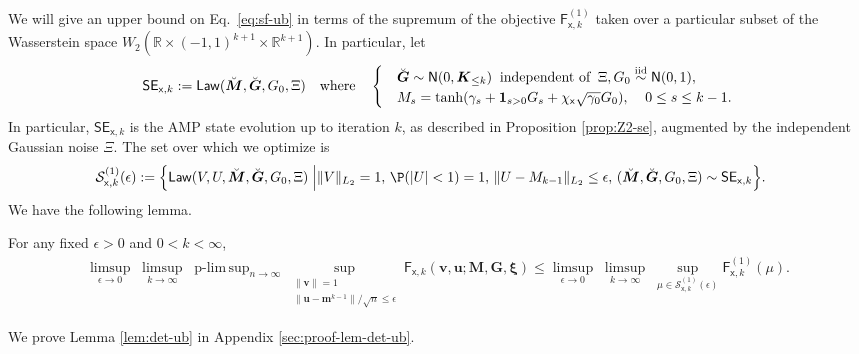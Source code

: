 \documentclass[]{article}
\def\sx{{\mathsf x}}
\def\normal{{\sf N}}
\def\bv{{\boldsymbol V}}
\def\bM{{\boldsymbol M}}
\def\bu{{\boldsymbol u}}
\def\bv{{\boldsymbol v}}
\def\bxi{{\boldsymbol \xi}}
\def\reals{{\mathbb R}}
\def\bG{{\boldsymbol G}}
\def\bv{{\boldsymbol v}}
\def\normal{{\sf N}}
\def\bu{{\boldsymbol u}}
\def\cS{{\mathcal S}}
\def\bbm{{\boldsymbol m}}
\def\cS{{\mathcal S}}
\def\bK{\boldsymbol{K}}
\newcommand{\indic}[1]{\mathbf{1}_{#1}}
\def\sF{\mathsf{F}}
\def\brevebM{\breve{\boldsymbol{M}}{}}
\def\brevebG{\breve{\boldsymbol{G}}{}}
\DeclareMathOperator*{\plimsup}{p-lim\,sup}
\def\Law{\mathsf{Law}}
\def\SE{\mathsf{SE}}
\begin{document}
We will give an upper bound on Eq.~\eqref{eq:sf-ub} 
in terms of the supremum of the objective $\sF^{(1)}_{\sx,k}$ taken over a particular subset of the Wasserstein space $W_2(\reals \times (-1,1)^{k+1} \times \reals^{k+1})$.  
In particular, let
\begin{equation}
    \SE_{\sx,k} := \Law(\brevebM,\brevebG,G_0,\Xi)
        \quad 
        \text{where}
        \quad
    \begin{cases}
        &\brevebG \sim \normal(0,\bK_{\leq k})
        \;\; 
        \text{independent of}
        \;\;
        \Xi,G_0 \stackrel{\mathrm{iid}}\sim \normal(0,1),
        \\
        &M_s = \tanh(\gamma_s + \indic{s > 0}G_s + \chi_{\sx} \sqrt{\gamma_0} G_0),\;\;\;\; 0 \leq s \leq k-1.
    \end{cases}
\end{equation}
In particular, $\SE_{\sx,k}$ is the AMP state evolution up to iteration $k$, 
as described in Proposition \ref{prop:Z2-se},
augmented by the independent Gaussian noise $\Xi$.
The set over which we optimize is
\begin{equation}
\begin{aligned}
    \cS^{(1)}_{\sx,k}(\epsilon)
        :=
        \Big\{
            \Law(V,U,\brevebM,\brevebG,G_0,\Xi)
            \Bigm|
            &\| V \|_{L_2} = 1, \,
            \P(|U| < 1) = 1,\,
            \| U - M_{k-1} \|_{L_2} \leq \epsilon,\,
            (\brevebM,\brevebG,G_0,\Xi) \sim \SE_{\sx,k}
        \Big\}.
\end{aligned}
\end{equation}
We have the following lemma.
\begin{lemma}
\label{lem:det-ub}
    For any fixed $\epsilon > 0$ and $0 < k < \infty$,
    \begin{equation}
    \label{eq:det-ub}
    \begin{aligned}
        \limsup_{\epsilon \rightarrow 0}\;
        \limsup_{k \rightarrow \infty}\;
        \plimsup_{n \rightarrow \infty}
        \sup_{\substack{ \| \bv \| = 1\\ 
                             \| \bu - \bbm^{k-1} \|/\sqrt{n} \leq \epsilon } }
                \sF_{\sx,k}(\bv,\bu;\bM,\bG,\bxi)
            \leq 
            \limsup_{\epsilon \rightarrow 0}\;
            \limsup_{k \rightarrow \infty}\;
            \sup_{\mu \in \cS^{(1)}_{\sx,k}(\epsilon)} \sF^{(1)}_{\sx,k}(\mu).
    \end{aligned}
    \end{equation}
\end{lemma}
\noindent We prove Lemma \ref{lem:det-ub} in Appendix \ref{sec:proof-lem-det-ub}.
\end{document}
